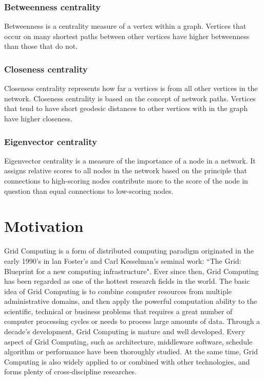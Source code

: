 \subsubsection{Betweenness centrality}
Betweenness is a centrality measure of a vertex within a graph. Vertices that occur on many shortest paths between other vertices have higher betweenness than those that do not.
\subsubsection{Closeness centrality}
Closeness centrality represents how far a vertices is from all other vertices in the network. Closeness centrality is based on the concept of network paths. Vertices that tend to have short geodesic distances to other vertices with in the graph have higher closeness.
\subsubsection{Eigenvector centrality}
Eigenvector centrality is a measure of the importance of a node in a network. It assigns relative scores to all nodes in the network based on the principle that connections to high-scoring nodes contribute more to the score of the node in question than equal connections to low-scoring nodes.

\section{Motivation \label{S:Motivation}}
Grid Computing is a form of distributed computing paradigm originated in the early 1990's in lan Foster's and Carl Kesselman's seminal work: ``The Grid: Blueprint for a new computing infrastructure". Ever since then, Grid Computing has been regarded as one of the hottest research fields in the world. The basic idea of Grid Computing is to combine computer resources from multiple administrative domains, and then apply the powerful computation ability to the scientific, technical or business problems that requires a great number of computer processing cycles or needs to process large amounts of data. Through a decade's development, Grid Computing is mature and well developed. Every aspect of Grid Computing, such as architecture, middleware software, schedule algorithm or performance have been thoroughly studied. At the same time, Grid Computing is also widely applied to or combined with other technologies, and forms plenty of cross-discipline researches.   


